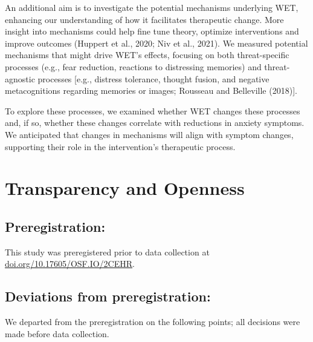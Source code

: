 \documentclass[
  man,floatsintext]{apa7}
\begin{document}
An additional aim is to investigate the potential mechanisms underlying WET, enhancing our understanding of how it facilitates therapeutic change.
More insight into mechanisms could help fine tune theory, optimize interventions and improve outcomes (Huppert et al., 2020; Niv et al., 2021).
We measured potential mechanisms that might drive WET's effects, focusing on both threat-specific processes (e.g., fear reduction, reactions to distressing memories) and threat-agnostic processes {[}e.g., distress tolerance, thought fusion, and negative metacognitions regarding memories or images; Rousseau and Belleville (2018){]}.

To explore these processes, we examined whether WET changes these processes and, if so, whether these changes correlate with reductions in anxiety symptoms.
We anticipated that changes in mechanisms will align with symptom changes, supporting their role in the intervention's therapeutic process.

\section{Transparency and Openness}\label{transparency-and-openness}

\subsection{Preregistration:}\label{preregistration}

This study was preregistered prior to data collection at \url{doi.org/10.17605/OSF.IO/2CEHR}.

\subsection{Deviations from preregistration:}\label{deviations-from-preregistration}

We departed from the preregistration on the following points; all decisions were made before data collection.
\end{document}
